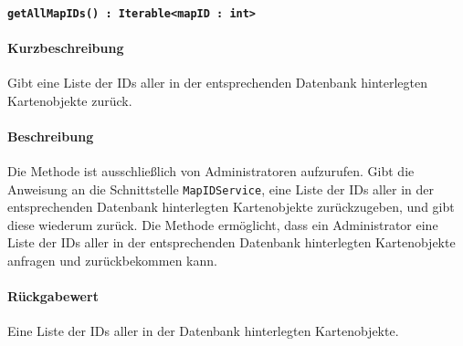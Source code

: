 \paragraph{\texttt{getAllMapIDs() : Iterable<mapID : int>}}%
\paragraph*{Kurzbeschreibung}
Gibt eine Liste der IDs aller in der entsprechenden Datenbank hinterlegten Kartenobjekte zurück.
\paragraph*{Beschreibung}
Die Methode ist ausschließlich von Administratoren aufzurufen.
Gibt die Anweisung an die Schnittstelle \texttt{MapIDService}, eine Liste der IDs aller in der entsprechenden Datenbank hinterlegten Kartenobjekte zurückzugeben, und gibt diese wiederum zurück.
Die Methode ermöglicht, dass ein Administrator eine Liste der IDs aller in der entsprechenden Datenbank hinterlegten Kartenobjekte anfragen und zurückbekommen kann.
\paragraph*{Rückgabewert}
Eine Liste der IDs aller in der Datenbank hinterlegten Kartenobjekte.
